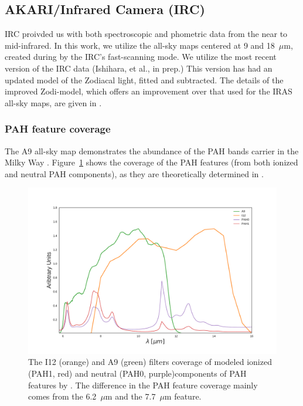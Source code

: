        \subsection{AKARI/Infrared Camera (IRC) }
           IRC proivded us with both spectroscopic and phometric data from the near to mid-infrared. In this work, we utilize the all-sky maps centered at 9 and 18~$\mu$m, created during by the IRC's fast-scanning mode. We utilize the most recent version of the IRC data (Ishihara, et al., in prep.) This version has had an updated model of the Zodiacal light, fitted and subtracted. The details of the improved Zodi-model, which offers an improvement over that used for the IRAS all-sky maps, are given in \cite{kondo16}.
       \subsubsection{PAH feature coverage}
         The A9 all-sky map demonstrates the abundance of the PAH bands carrier in the Milky Way \citep{ishihara10}. Figure~\ref{fig:Filter_coverage_example_PAH} shows the coverage of the PAH features (from both ionized and neutral PAH components), as they are theoretically determined in \cite{dustem11}.
            \begin{figure}
              \centering
              \includegraphics[width=\textwidth]{../Plots/ch_datasources/Filter_coverage_example_PAH.pdf}
              \caption{The I12 (orange) and A9 (green) filters coverage of modeled ionized (PAH1, red) and neutral (PAH0, purple)components of PAH features by \cite{dustem11}. The difference in the PAH feature coverage mainly comes from the 6.2~$\mu$m and the 7.7~$\mu$m feature.}
              \label{fig:Filter_coverage_example_PAH}
            \end{figure}
